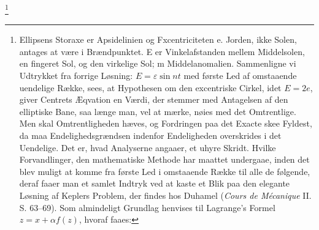 \documentclass[12pt,a4paper]{book}
\begin{document}
\footnote{%
Ellipsens Storaxe er Apsidelinien og
Fxcentriciteten e. Jorden, ikke Solen, antages at være i Brændpunktet. E
er Vinkelafstanden mellem Middelsolen, en fingeret Sol, og den virkelige
Sol; m Middelanomalien. Sammenligne vi Udtrykket fra forrige Løsning:
$E = \varepsilon \sin nt$ med første Led af omstaaende uendelige Række,
sees, at Hypothesen om den excentriske Cirkel, idet
$E = 2 e$, giver Centrets Æqvation en Værdi, der stemmer med Antagelsen
af den elliptiske Bane, saa længe man, vel at mærke, nøies med det
Omtrentlige. Men skal Omtrentligheden hæves, og Fordringen paa det
Exacte skee Fyldest, da maa Endelighedsgrændsen indenfor Endeligheden
overskrides i det Uendelige. Det er, hvad Analyserne angaaer, et uhyre
Skridt. Hvilke Forvandlinger, den mathematiske Methode har maattet
undergaae, inden det blev muligt at komme fra første Led i omstaaende
Række til alle de følgende, deraf faaer man et samlet Indtryk ved at
kaste et Blik paa den elegante Løsning af Keplers Problem, der findes
hos Duhamel (\textit{Cours de Mécanique} II. S. 63--69). Som almindeligt
Grundlag henvises til Lagrange's Formel $z = x + \alpha f(z)$, hvoraf
faaes:
}
\end{document}

